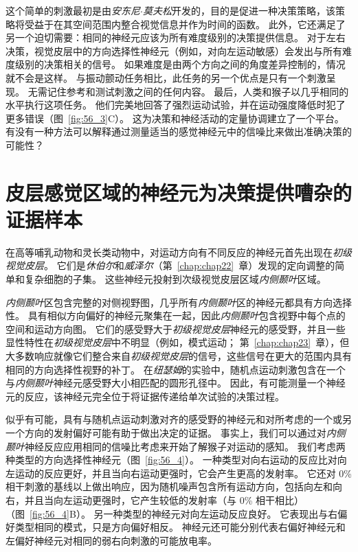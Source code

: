 这个简单的刺激最初是由\textit{安东尼$\cdot$莫夫松}开发的，目的是促进一种决策策略，该策略将受益于在其空间范围内整合视觉信息并作为时间的函数。
此外，它还满足了另一个迫切需要：相同的神经元应该为所有难度级别的决策提供信息。
对于左右决策，视觉皮层中的方向选择性神经元（例如，对向左运动敏感）会发出与所有难度级别的决策相关的信号。
如果难度是由两个方向之间的角度差异控制的，情况就不会是这样。
与振动颤动任务相比，此任务的另一个优点是只有一个刺激呈现。
无需记住参考和测试刺激之间的任何内容。
最后，人类和猴子以几乎相同的水平执行这项任务。
他们完美地回答了强烈运动试验，并在运动强度降低时犯了更多错误（图~\ref{fig:56_3}C）。
这为决策和神经活动的定量协调建立了一个平台。
有没有一种方法可以解释通过测量适当的感觉神经元中的信噪比来做出准确决策的可能性？



\section{皮层感觉区域的神经元为决策提供嘈杂的证据样本}

在高等哺乳动物和灵长类动物中，对运动方向有不同反应的神经元首先出现在\textit{初级视觉皮层}。
它们是\textit{休伯尔}和\textit{威泽尔}（第~\ref{chap:chap22}~章）发现的定向调整的简单和复杂细胞的子集。
这些神经元投射到次级视觉皮层区域\textit{内侧颞叶}区域。


\textit{内侧颞叶}区包含完整的对侧视野图，几乎所有\textit{内侧颞叶}区的神经元都具有方向选择性。
具有相似方向偏好的神经元聚集在一起，因此\textit{内侧颞叶}包含视野中每个点的空间和运动方向图。
它们的感受野大于\textit{初级视觉皮层}神经元的感受野，并且一些显性特性在\textit{初级视觉皮层}中不明显（例如，模式运动；
第~\ref{chap:chap23}~章），但大多数响应就像它们整合来自\textit{初级视觉皮层}的信号，这些信号在更大的范围内具有相同的方向选择性视野的补丁。
在\textit{纽瑟姆}的实验中，随机点运动刺激包含在一个与\textit{内侧颞叶}神经元感受野大小相匹配的圆形孔径中。
因此，有可能测量一个神经元的反应，该神经元完全位于将证据传递给单次试验的决策过程。


似乎有可能，具有与随机点运动刺激对齐的感受野的神经元和对所考虑的一个或另一个方向的发射偏好可能有助于做出决定的证据。
事实上，我们可以通过对\textit{内侧颞叶}神经反应应用相同的信噪比考虑来开始了解猴子对运动的感知。
我们考虑两种类型的方向选择性神经元（图~\ref{fig:56_4}）。
一种类型对向右运动的反应比对向左运动的反应更好，并且当向右运动更强时，它会产生更高的发射率。
它还对 0\% 相干刺激的基线以上做出响应，因为随机噪声包含所有运动方向，包括向左和向右，并且当向左运动更强时，它产生较低的发射率（与 0\% 相干相比）（图~\ref{fig:56_4}B）。
另一种类型的神经元对向左运动反应良好。
它表现出与右偏好类型相同的模式，只是方向偏好相反。
神经元还可能分别代表右偏好神经元和左偏好神经元对相同的弱右向刺激的可能放电率。


